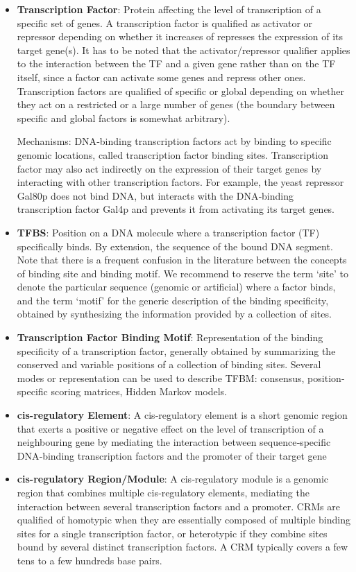 \begin{itemize}
    \item \textbf{Transcription Factor}: Protein affecting the level of transcription of a specific set of genes. A transcription factor is qualified as activator or repressor depending on whether it increases of represses the expression of its target gene(s). It has to be noted that the activator/repressor qualifier applies to the interaction between the TF and a given gene rather than on the TF itself, since a factor can activate some genes and repress other ones. Transcription factors are qualified of specific or global depending on whether they act on a restricted or a large number of genes (the boundary between specific and global factors is somewhat arbitrary).

    Mechanisms: DNA‐binding transcription factors act by binding to specific genomic locations, called transcription factor binding sites. Transcription factor may also act indirectly on the expression of their target genes by interacting with other transcription factors. For example, the yeast repressor Gal80p does not bind DNA, but interacts with the DNA‐binding transcription factor Gal4p and prevents it from activating its target genes.
    \item \textbf{TFBS}: Position on a DNA molecule where a transcription factor (TF) specifically binds. By extension, the sequence of the bound DNA segment. Note that there is a frequent confusion in the literature between the concepts of binding site and binding motif. We recommend to reserve the term ‘site’ to denote the particular sequence (genomic or artificial) where a factor binds, and the term ‘motif’ for the generic description of the binding specificity, obtained by synthesizing the information provided by a collection of sites.
    
    \item \textbf{Transcription Factor Binding Motif}: Representation of the binding specificity of a transcription factor, generally obtained by summarizing the conserved and variable positions of a collection of binding sites. Several modes or representation can be used to describe TFBM: consensus, position‐specific scoring matrices, Hidden Markov models.
    
    

    \item \textbf{cis-regulatory Element}: A cis‐regulatory element is a short genomic region that exerts a positive or negative effect on the level of transcription of a neighbouring gene by mediating the interaction between sequence‐specific DNA‐binding transcription factors and the promoter of their target gene
    \item \textbf{cis-regulatory Region/Module}: A cis‐regulatory module is a genomic region that combines multiple cis‐regulatory elements, mediating the interaction between several transcription factors and a promoter. CRMs are qualified of homotypic when they are essentially composed of multiple binding sites for a single transcription factor, or heterotypic if they combine sites bound by several distinct transcription factors. A CRM typically covers a few tens to a few hundreds base pairs.


\end{itemize}
